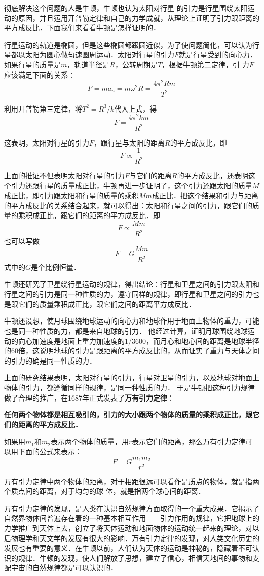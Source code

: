 彻底解决这个问题的人是牛顿，牛顿也认为太阳对行星
的引力是行星围绕太阳运动的原因，并且运用开普勒定律和自己的力学成就，从理论上证明了引力跟距离的平方成反比．下面我们来看看牛顿是怎样证明的．

行星运动的轨道是椭圆，但是这些椭圆都跟圆近似，为了使问题简化，可以认为行星都以太阳为圆心做匀速圆周运动．太阳对行星的引力$F$就是行星受到的向心力．如果行星的质量是$m$，轨道半径是$R$，公转周期是$T$，根据牛顿第二定律，引
力$F$应该满足下面的关系：
\[F=ma_n=m\omega^2 R=\frac{4\pi^2 Rm}{T^2} \]

利用开普勒第三定律，将$T^2=R^3/k$代入上式，得
\[F=\frac{4\pi^2km}{R^2} \]

这表明，太阳对行星的引力$F$，跟行星与太阳的距离$R$的平方成反比，即
\[F\propto \frac{1}{R^2} \]

上面的推证不但表明太阳对行星的引力$F$与它们的距离$R$的平方成反比，还表明这个引力还跟行星的质量成正比，牛顿再进一步证明了，这个引力还跟太阳的质量$M$成正比，即引力跟太阳和行星的质量的乘积$Mm$成正比．把这个结果和引力与距离的平方成反比的关系结合起来，就可以得出：太阳和行星之间的引力，跟它们的质量的乘积成正比，跟它们的距离的平方成反比．即
\[F\propto \frac{Mm}{R^2} \]
也可以写做
\[F=G\frac{Mm}{R^2} \]
式中的$G$是个比例恒量．

牛顿还研究了卫星绕行星运动的规律，得出结论：行星和卫星之间的引力跟太阳和行星之间的引力是同一种性质的力，遵守同样的规律，即行星和卫星之间的引力也是跟它们的质量乘积成正比，跟它们之间的距离平方成反比．

牛顿还设想，使月球围绕地球运动的向心力和地球作用于地面上物体的重力，可能也是同一种性质的力，都是来自地球的引力．
他经过计算，证明月球围绕地球运动的向心加速度是地面上重力加速度的1/3600，而月心和地心间的距离是地球半径的60倍，这说明地球的引力是跟距离的平方成反比的，从而证实了重力与天体之间的引力的确是同一性质的力．

上面的研究结果表明，太阳对行星的引力，行星对卫星的引力，以及地球对地面上物体的引力，都遵循同样的规律，是同一种性质的力．
于是牛顿把这种引力规律做了合理的推广，在1687年正式发表了\textbf{万有引力定律}：

\textbf{任何两个物体都是相互吸引的，引力的大小跟两个物体的质量的乘积成正比，跟它们的距离的平方成反比．}

如果用$m_1$和$m_2$表示两个物体的质量，用$r$表示它们的距离，那么万有引力定律可以用下面的公式来表示：
\[ F=G\frac{m_1m_2}{r^2}\]

万有引力定律中两个物体的距离，对于相距很远可以看作是质点的物体，就是指两个质点间的距离，对于均匀的球
体，就是指两个球心间的距离．

万有引力定律的发现，是人类在认识自然规律方面取得的一个重大成果．它揭示了自然界物体间普遍存在着的一种基本相互作用——引力作用的规律，它把地球上的力学推广到天体上去，创立了将天体运动和地面物体的运动统一起来的理论，对以后物理学和天文学的发展有很大的影响．万有引力定律的发现，对人类文化历史的发展也有重要的意义．在牛顿以前，人们认为天体的运动是神秘的，隐藏着不可认识的规律．牛顿的发现，使人们解放了思想，建立了信心，相信天地间的事物和支配宇宙的自然规律都是可以认识的．

